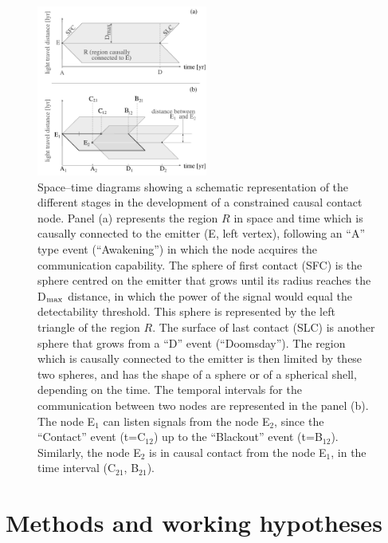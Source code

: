 \documentclass[crop]{CSLB}
\newcommand{\cetis}{nodes}
\begin{document}
\begin{figure}[!t]
   \centering
   \includegraphics[width=0.5\textwidth]{F_scheme.pdf}
   \caption{
Space--time diagrams showing a schematic representation of the different stages
in the development of a constrained causal contact node.
%
Panel (a) represents the region $R$ in space and time which is causally
connected to the emitter (E, left vertex), following an ``A'' type
event (``Awakening'') in which the node acquires the communication
capability.
%
The sphere of first contact (SFC) is the sphere centred on the emitter that
grows until its radius reaches the D$_{\rm max}$ distance, in which the
power of the signal would equal the detectability threshold.
%
This sphere is represented by the left triangle of the region
$R$.
%
The surface of last contact (SLC) is another sphere that grows from a ``D''
event (``Doomsday'').
%
The region which is causally connected to the emitter is then limited by these
two spheres, and has the shape of a sphere or of a spherical shell,
depending on the time.
%
The temporal intervals for the communication between two \cetis{} are
represented in the panel (b).
%
The node E$_1$ can listen signals from the node E$_2$, since
the ``Contact'' event (t=C$_{12}$) up to the ``Blackout'' event
(t=B$_{12}$).
%
Similarly, the node E$_2$ is in causal contact from the
   node E$_1$, in the time interval (C$_{21}$, B$_{21}$).
%
} \label{F_scheme}
%
\end{figure}



\section{Methods and working hypotheses}\label{S_methods}
\end{document}
